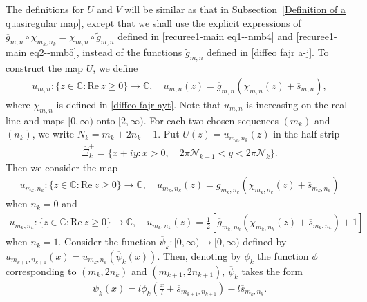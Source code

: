 \documentclass[12pt]{amsart}
\numberwithin{equation}{section}
\begin{document}
The definitions for $U$ and $V$ will be similar as that in Subsection~\ref{Definition of a quasiregular map}, except that we shall use the explicit expressions of $\overline{g}_{m,n}\circ\chi_{m_k,n_k}=\overline{\chi}_{m,n}\circ \tilde{g}_{m,n}$ defined in \eqref{recuree1-main eq1--nmb4} and \eqref{recuree1-main eq2--nmb5}, instead of the functions $\tilde{g}_{m,n}$ defined in \eqref{diffeo  fajr  a-j}. To construct the map $U$, we define
\begin{equation*}
\begin{split}
u_{m,n}: \{z\in\mathbb{C}: \text{Re}\ z\geq0 \}\to\mathbb{C}, \quad u_{m,n}(z)=\overline{g}_{m,n}(\chi_{m,n}(z)+\overline{s}_{m,n}),
\end{split}
\end{equation*}
where $\chi_{m,n}$ is defined in \eqref{diffeo  fajr  ayt}.
Note that $u_{m,n}$ is increasing on the real line and maps $[0,\infty)$ onto $[2,\infty)$.
For each two chosen sequences $(m_k)$ and $(n_k)$, we write $N_k=m_k+2n_k+1$. Put $U(z)=u_{m_k,n_k}(z)$ in the half-strip
\begin{equation*}
\begin{split}
\hat{\Xi}_k^{+}=\{x+iy: x>0, \quad  2\pi\mathcal{N}_{k-1}<y<2\pi\mathcal{N}_k\}.
\end{split}
\end{equation*}
Then we consider the map
\begin{equation*}
\begin{split}
u_{m_k,n_k}: \{z\in\mathbb{C}: \text{Re}\ z\geq0 \}\to\mathbb{C}, \quad u_{m_k,n_k}(z)=\overline{g}_{m_k,n_k}(\chi_{m_k,n_k}(z)+\overline{s}_{m_k,n_k})
\end{split}
\end{equation*}
when $n_k=0$ and
\begin{equation*}
\begin{split}
u_{m_k,n_k}: \{z\in\mathbb{C}: \text{Re}\ z\geq0 \}\to\mathbb{C}, \quad u_{m_k,n_k}(z)=\frac{1}{2}\left[\overline{g}_{m_k,n_k}(\chi_{m_k,n_k}(z)+\overline{s}_{m_k,n_k})+1\right]
\end{split}
\end{equation*}
when $n_k=1$. Consider the function $\overline{\psi}_k:[0,\infty)\to[0,\infty)$ defined by $u_{m_{k+1},n_{k+1}}(x)=u_{m_k,n_k}(\overline{\psi}_k(x))$. Then, denoting by $\phi_k$ the function $\phi$ corresponding to $(m_k,2n_k)$ and $(m_{k+1},2n_{k+1})$, $\overline{\psi}_k$ takes the form
\begin{equation*}%
\begin{split}
\overline{\psi}_k(x)=l\overline{\phi}_k\left(\frac{x}{l}+\overline{s}_{m_{k+1},n_{k+1}}\right)-l\overline{s}_{m_{k},n_{k}}.
\end{split}
\end{equation*}
\end{document}
